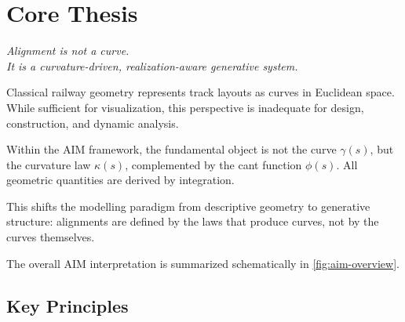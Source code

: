 
\cleardoublepage
\chapter*{Core Thesis}
{}

\begin{center}
\large
\textit{
Alignment is not a curve.\\
It is a curvature-driven, realization-aware generative system.
}
\end{center}

\vspace{1em}

Classical railway geometry represents track layouts as curves in
Euclidean space.
While sufficient for visualization, this perspective is inadequate for
design, construction, and dynamic analysis.

Within the AIM framework, the fundamental object is not the curve
\(\gamma(s)\), but the curvature law \(\kappa(s)\), complemented by the
cant function \(\phi(s)\).
All geometric quantities are derived by integration.

This shifts the modelling paradigm from descriptive geometry to
generative structure:
alignments are defined by the laws that produce curves, not by the
curves themselves.

The overall AIM interpretation is summarized schematically in
\cref{fig:aim-overview}.

\section*{Key Principles}

